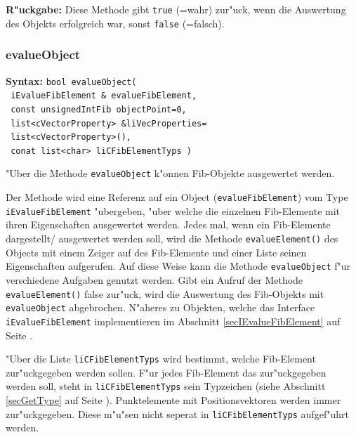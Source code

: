 \bigskip\noindent
\textbf{R"uckgabe:} Diese Methode gibt \verb|true| (=wahr) zur"uck, wenn die Auswertung des Objekts erfolgreich war, sonst \verb|false| (=falsch).


\subsubsection{evalueObject}
\label{secEvalueObjectFibElement}

\textbf{Syntax:} \verb|bool evalueObject(| \\\verb| iEvalueFibElement & evalueFibElement,| \\\verb| const unsignedIntFib objectPoint=0,| \\\verb| list<cVectorProperty> &liVecProperties=| \\\verb| list<cVectorProperty>(),| \\\verb| conat list<char> liCFibElementTyps )|


\bigskip\noindent
"Uber die Methode \verb|evalueObject| k"onnen Fib-Objekte ausgewertet werden.

Der Methode wird eine Referenz auf ein Object (\verb|evalueFibElement|) vom Type \verb|iEvalueFibElement| "ubergeben, "uber welche die einzelnen Fib-Elemente mit ihren Eigenschaften ausgewertet werden. Jedes mal, wenn ein Fib-Elemente dargestellt/ ausgewertet werden soll, wird die Methode \verb|evalueElement()| des Objects mit einem Zeiger auf des Fib-Elemente und einer Liste seinen Eigenschaften aufgerufen. Auf diese Weise kann die Methode \verb|evalueObject| f"ur verschiedene Aufgaben genutzt werden.
Gibt ein Aufruf der Methode \verb|evalueElement()| false zur"uck, wird die Auswertung des Fib-Objekts mit \verb|evalueObject| abgebrochen.
N"aheres zu Objekten, welche das Interface \verb|iEvalueFibElement| implementieren im Abschnitt \ref{secIEvalueFibElement} auf Seite \pageref{secIEvalueFibElement} .

"Uber die Liste \verb|liCFibElementTyps| wird bestimmt, welche Fib-Element zur"uckgegeben werden sollen. F"ur jedes Fib-Element das zur"uckgegeben werden soll, steht in \verb|liCFibElementTyps| sein Typzeichen (siehe Abschnitt \ref{secGetType} auf Seite \pageref{secGetType}). Punktelemente mit Positionsvektoren werden immer zur"uckgegeben. Diese m"u"sen nicht seperat in \verb|liCFibElementTyps| aufgef"uhrt werden.

